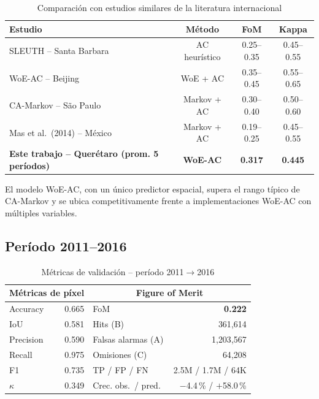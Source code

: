 \begin{table}[htbp]
\centering
\caption{Comparación con estudios similares de la literatura internacional}
\label{tab:literature_comparison}
\begin{tabular}{lccc}
\toprule
\textbf{Estudio} & \textbf{Método} & \textbf{FoM} & \textbf{Kappa} \\
\midrule
SLEUTH -- Santa Barbara \parencite{Clarke2007} & AC heurístico & 0.25--0.35 & 0.45--0.55 \\
WoE-AC -- Beijing & WoE + AC & 0.35--0.45 & 0.55--0.65 \\
CA-Markov -- São Paulo & Markov + AC & 0.30--0.40 & 0.50--0.60 \\
Mas et al.\ (2014) -- México \parencite{pontius2008comparing} & Markov + AC & 0.19--0.25 & 0.45--0.55 \\
\textbf{Este trabajo -- Querétaro (prom. 5 períodos)} & \textbf{WoE-AC} & \textbf{0.317} & \textbf{0.445} \\
\bottomrule
\end{tabular}
\end{table}

El modelo WoE-AC, con un único predictor espacial, supera el rango típico de CA-Markov y se ubica competitivamente frente a implementaciones WoE-AC con múltiples variables.

\clearpage
\subsection{Período 2011--2016}

\begin{table}[H]
\centering
\caption{Métricas de validación -- período 2011$\rightarrow$2016}
\label{tab:metrics_2011_2016}
\small
\begin{tabular}{lrlr}
\toprule
\multicolumn{2}{c}{\textbf{Métricas de píxel}} & \multicolumn{2}{c}{\textbf{Figure of Merit}} \\
\midrule
Accuracy  & 0.665 & FoM                  & \textbf{0.222} \\
IoU       & 0.581 & Hits (B)             & 361{,}614 \\
Precision & 0.590 & Falsas alarmas (A)   & 1{,}203{,}567 \\
Recall    & 0.975 & Omisiones (C)        & 64{,}208 \\
F1        & 0.735 & TP / FP / FN         & 2.5M / 1.7M / 64K \\
$\kappa$  & 0.349 & Crec. obs.\ / pred.\ & $-$4.4\,\% / $+$58.0\,\% \\
\bottomrule
\end{tabular}
\end{table}

